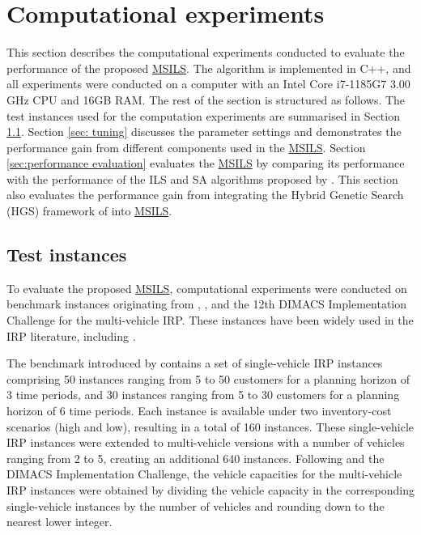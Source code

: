\documentclass{article}
\begin{document}
\section{Computational experiments} \label{sec: computational experiements}

This section describes the computational experiments conducted to evaluate the performance of the proposed \hyperref[alg:MSILS]{MSILS}. The algorithm is implemented in C++, and all experiments were conducted on a computer with an Intel Core i7-1185G7 3.00 GHz CPU and 16GB RAM. The rest of the section is structured as follows. The test instances used for the computation experiments are summarised in Section \ref{sec: test instances}. Section \ref{sec: tuning} discusses the parameter settings and demonstrates the performance gain from different components used in the \hyperref[alg:MSILS]{MSILS}. Section \ref{sec:performance evaluation} evaluates the \hyperref[alg:MSILS]{MSILS} by comparing its performance with the performance of the ILS and SA algorithms proposed by \cite{alvarez2018iterated}. This section also evaluates the performance gain from integrating the Hybrid Genetic Search (HGS) framework of \cite{vidal2022hybrid} into \hyperref[alg:MSILS]{MSILS}.

\subsection{Test instances} \label{sec: test instances}

To evaluate the proposed \hyperref[alg:MSILS]{MSILS}, computational experiments were conducted on benchmark instances originating from \cite{archetti2007branch}, \cite{archetti2012hybrid}, and the 12th DIMACS Implementation Challenge for the multi-vehicle IRP. These instances have been widely used in the IRP literature, including \cite{archetti2012hybrid, coelho2013branch, desaulniers2016branch, santos2016hybrid, archetti2017logistic, alvarez2018iterated,  archetti2019exact, castro2026hybrid}.

The benchmark introduced by \cite{archetti2007branch} contains a set of single-vehicle IRP instances comprising 50 instances ranging from 5 to 50 customers for a planning horizon of 3 time periods, and 30 instances ranging from 5 to 30 customers for a planning horizon of 6 time periods. Each instance is available under two inventory-cost scenarios (high and low), resulting in a total of 160 instances. These single-vehicle IRP instances were extended to multi-vehicle versions with a number of vehicles ranging from 2 to 5, creating an additional 640 instances. Following \cite{alvarez2018iterated} and the DIMACS Implementation Challenge, the vehicle capacities for the multi-vehicle IRP instances were obtained by dividing the vehicle capacity in the corresponding single-vehicle instances by the number of vehicles and rounding down to the nearest lower integer.
\end{document}
